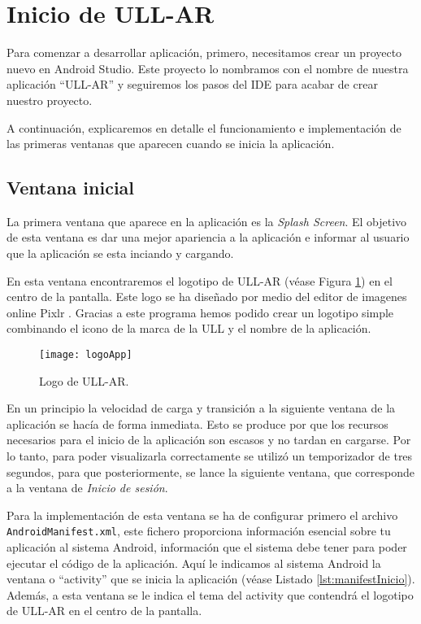 \vskip 1.9in

\section{Inicio de ULL-AR} \label{chap:StartApplication} 

Para comenzar a desarrollar aplicación, primero, necesitamos crear un proyecto nuevo en Android Studio. Este proyecto lo nombramos con el nombre de nuestra aplicación ``ULL-AR'' y seguiremos los pasos del IDE para acabar de crear nuestro proyecto. 

A continuación, explicaremos en detalle el funcionamiento e implementación de las primeras ventanas que aparecen cuando se inicia la aplicación. 

\subsection{Ventana inicial}

La primera ventana que aparece en la aplicación es la \textit{Splash Screen}. El objetivo de esta ventana es dar una mejor apariencia a la aplicación e informar al usuario que la aplicación se esta inciando y cargando. 

En esta ventana encontraremos el logotipo de ULL-AR (véase Figura \ref{fig:logoApp}) en el centro de la pantalla. Este logo se ha diseñado por medio del editor de imagenes online Pixlr \cite{URL::pixlr}. Gracias a este programa hemos podido crear un logotipo simple combinando el icono de la marca de la ULL y el nombre de la aplicación.
 
\begin{figure}[h]
    \centering
    \texttt{[image: logoApp]}
    \caption{Logo de ULL-AR.}
    \label{fig:logoApp}
\end{figure}    
 

En un principio la velocidad de carga y transición a la siguiente ventana de la aplicación se hacía de forma inmediata. Esto se produce por que los recursos necesarios para el inicio de la aplicación son escasos y no tardan en cargarse. Por lo tanto, para poder visualizarla correctamente se utilizó un temporizador de tres segundos, para que posteriormente, se lance la siguiente ventana, que corresponde a la ventana de \textit{Inicio de sesión}.

Para la implementación de esta ventana se ha de configurar primero el archivo \texttt{AndroidManifest.xml}, este fichero proporciona información esencial sobre tu aplicación al sistema Android, información que el sistema debe tener para poder ejecutar el código de la aplicación. Aquí le indicamos al sistema Android la ventana o ``activity'' \cite{URL::activity} que se inicia la aplicación (véase Listado \ref{lst:manifestInicio}). Además, a esta ventana se le indica el tema del activity que contendrá el logotipo de ULL-AR en el centro de la pantalla.

